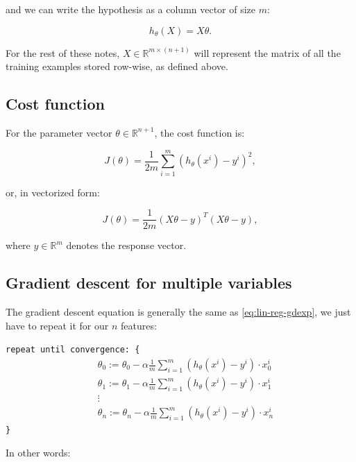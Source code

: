 \documentclass[a4paper,11pt]{report}
\newcommand{\ds}{\displaystyle}
\begin{document}
and we can write the hypothesis as a column vector of size $m$:

\begin{equation}\label{eq:mul-reg-hyp-mat}
h_\theta(X) = X \theta .
\end{equation}

For the rest of these notes, $X\in\mathbb{R}^{m\times(n+1)}$ will represent the matrix of all the training examples stored row-wise, as defined above.

\subsection*{Cost function}

For the parameter vector $\theta\in \mathbb{R}^{n+1}$, the cost function is:

\begin{equation}\label{eq:mul-reg-cost}
J(\theta) = \ds\frac{1}{2m}\sum_{i=1}^{m}{(h_\theta(x^i)- y^i)^2},
\end{equation}

or, in vectorized form:

\begin{equation}\label{eq:mul-reg-cost-vec}
J(\theta) = \dfrac{1}{2m}(X\theta - {y})^T(X\theta - {y}),
\end{equation}

where $y\in \mathbb{R}^m$ denotes the response vector.


\subsection*{Gradient descent for multiple variables}

The gradient descent equation is generally the same as \eqref{eq:lin-reg-gdexp}, we just have to repeat it for our $n$ features:

\verb"repeat until convergence: {"
\begin{align*}
\; & \theta_0 := \theta_0 - \alpha \frac{1}{m} \sum\limits_{i=1}^{m} (h_\theta(x^{i}) - y^{i}) \cdot x_0^{i}\\
\; & \theta_1 := \theta_1 - \alpha \frac{1}{m} \sum\limits_{i=1}^{m} (h_\theta(x^{i}) - y^{i}) \cdot x_1^{i} \\
& \vdots \\
\; & \theta_n := \theta_n - \alpha \frac{1}{m} \sum\limits_{i=1}^{m} (h_\theta(x^{i}) - y^{i}) \cdot x_n^{i}
\end{align*}
\verb"}"

In other words:
\end{document}
